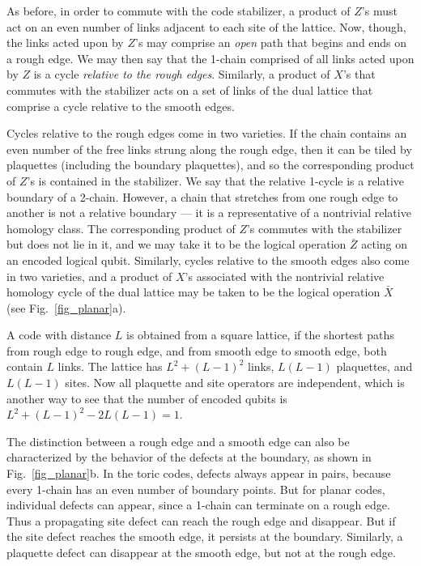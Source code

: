 As before, in order to commute with the code stabilizer, a product of $Z$'s must act on an even number of links adjacent to each site of the lattice. Now, though, the links acted upon by $Z$'s may comprise an {\em open} path that begins and ends on a rough edge. We may then say that the 1-chain comprised of all links acted upon by $Z$ is a cycle {\em relative to the rough edges}. Similarly, a product of $X$'s that commutes with the stabilizer acts on a set of links of the dual lattice that comprise a cycle relative to the smooth edges.  

Cycles relative to the rough edges come in two varieties. If the chain contains an even number of the free links strung along the rough edge, then it can be tiled by plaquettes (including the boundary plaquettes), and so the corresponding product of $Z$'s is contained in the stabilizer. We say that the relative 1-cycle is a relative boundary of a 2-chain. However, a chain that stretches from one rough edge to another is not a relative boundary --- it is a representative of a nontrivial relative homology class. The corresponding product of $Z$'s commutes with the stabilizer but does not lie in it, and we may take it to be the logical operation $\bar Z$ acting on an encoded logical qubit.  Similarly, cycles relative to the smooth edges also come in two varieties, and a product of $X$'s associated with the nontrivial relative homology cycle of the dual lattice may be taken to be the logical operation $\bar X$ (see Fig.~\ref{fig_planar}a).

A code with distance $L$ is obtained from a square lattice, if the shortest paths from rough edge to rough edge, and from smooth edge to smooth edge, both contain $L$ links.  The lattice has $L^2 +(L-1)^2$ links,  $L(L-1)$ plaquettes, and $L(L-1)$ sites.  Now all plaquette and site operators are independent, which is another way to see that the number of encoded qubits is $L^2 +(L-1)^2- 2L(L-1)=1$. 

The distinction between a rough edge and a smooth edge can also be characterized by the behavior of the defects at the boundary, as shown in Fig.~\ref{fig_planar}b.  In the toric codes, defects always appear in pairs, because every 1-chain has an even number of boundary points. But for planar codes, individual defects can appear, since a 1-chain can terminate on a rough edge.  Thus a propagating site defect can reach the rough edge and disappear. But if the site defect reaches the smooth edge, it persists at the boundary. Similarly, a plaquette defect can disappear at the smooth edge, but not at the rough edge. 

